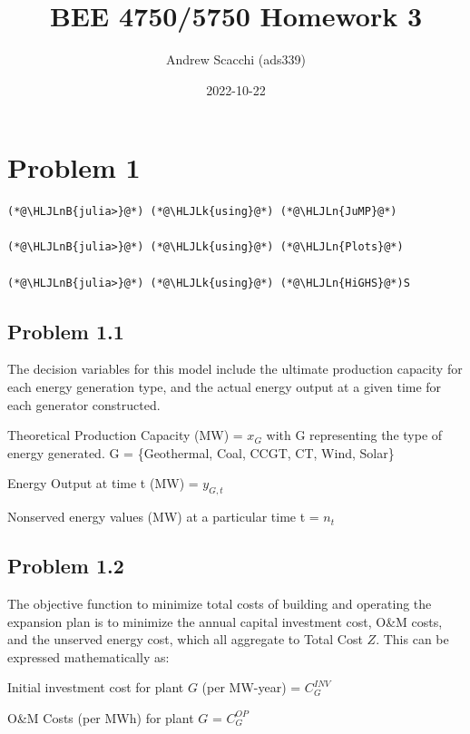 \documentclass[12pt,a4paper]{article}
\title{ BEE 4750/5750 Homework 3 }
\author{ Andrew Scacchi (ads339) }
\date{ 2022-10-22 }
\newcommand{\HLJLk}[1]{\textcolor[RGB]{148,91,176}{\textbf{#1}}}
\newcommand{\HLJLn}[1]{#1}
\newcommand{\HLJLnB}[1]{\textcolor[RGB]{59,151,46}{#1}}
\begin{document}
\maketitle





\section{Problem 1}

\begin{lstlisting}
(*@\HLJLnB{julia>}@*) (*@\HLJLk{using}@*) (*@\HLJLn{JuMP}@*)

(*@\HLJLnB{julia>}@*) (*@\HLJLk{using}@*) (*@\HLJLn{Plots}@*)

(*@\HLJLnB{julia>}@*) (*@\HLJLk{using}@*) (*@\HLJLn{HiGHS}@*)S
\end{lstlisting}

\subsection{Problem 1.1}
The decision variables for this model include the ultimate production capacity for each energy generation type, and the actual energy output at a given time for each generator constructed.

Theoretical Production Capacity (MW) = $x_G$ with G representing the type of energy generated. G = \{Geothermal, Coal, CCGT, CT, Wind, Solar\}

Energy Output at time t (MW) = $y_{G,t}$

Nonserved energy values (MW) at a particular time t = $n_t$

\subsection{Problem 1.2}
The objective function  to minimize total costs of building and operating the expansion plan is to minimize the annual capital investment cost, O\&M costs, and the unserved energy cost,  which all aggregate to Total Cost $Z$. This can be expressed mathematically as:

Initial investment cost for plant $G$ (per MW-year) = $C_G^{INV}$

O\&M Costs (per MWh) for plant $G$ = $C_G^{OP}$
\end{document}
